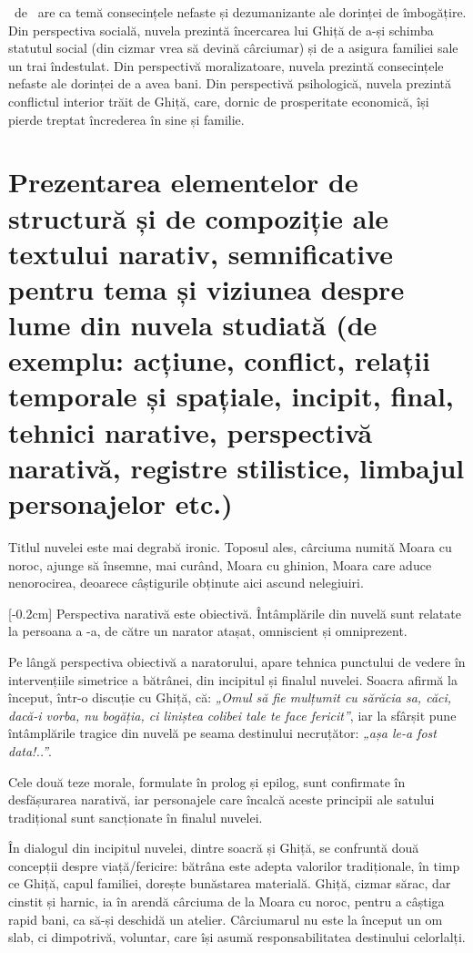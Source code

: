 \operatitle\ de \operaauthor\ are ca temă consecințele nefaste și dezumanizante ale dorinței de îmbogățire. Din perspectiva socială, nuvela prezintă încercarea lui Ghiță de a-și schimba statutul social (din cizmar vrea să devină cârciumar) și de a asigura familiei sale un trai îndestulat. Din perspectivă moralizatoare, nuvela prezintă consecințele nefaste ale dorinței de a avea bani. Din perspectivă psihologică, nuvela prezintă conflictul interior trăit de Ghiță, care, dornic de prosperitate economică, își pierde treptat încrederea în sine și familie.


\section{Prezentarea elementelor de structură și de compoziție ale textului narativ, semnificative pentru tema și viziunea despre lume din nuvela studiată {\footnotesize\normalfont (de exemplu: acțiune, conflict, relații temporale și spațiale, incipit, final, tehnici narative, perspectivă narativă, registre stilistice, limbajul personajelor etc.)}}

Titlul nuvelei este mai degrabă ironic. Toposul ales, cârciuma numită Moara cu noroc, ajunge să însemne, mai curând, Moara cu ghinion, Moara care aduce nenorocirea, deoarece câștigurile obținute aici ascund nelegiuiri.

[-0.2cm]
Perspectiva narativă este obiectivă. Întâmplările din nuvelă sunt relatate la persoana a -a, de către un narator atașat, omniscient și omniprezent.

Pe lângă perspectiva obiectivă a naratorului, apare tehnica punctului de vedere în intervențiile simetrice a bătrânei, din incipitul și finalul nuvelei. Soacra afirmă la început, într-o discuție cu Ghiță, că: \textit{„Omul să fie mulțumit cu sărăcia sa, căci, dacă-i vorba, nu bogăția, ci liniștea colibei tale te face fericit”}, iar la sfârșit pune întâmplările tragice din nuvelă pe seama destinului necruțător: \textit{„așa le-a fost data!..”}.

Cele două teze morale, formulate în prolog și epilog, sunt confirmate în desfășurarea narativă, iar personajele care încalcă aceste principii ale satului tradițional sunt sancționate în finalul nuvelei.

În dialogul din incipitul nuvelei, dintre soacră și Ghiță, se confruntă două concepții despre viață/fericire: bătrâna este adepta valorilor tradiționale, în timp ce Ghiță, capul familiei, dorește bunăstarea materială. Ghiță, cizmar sărac, dar cinstit și harnic, ia în arendă cârciuma de la Moara cu noroc, pentru a câștiga rapid bani, ca să-și deschidă un atelier. Cârciumarul nu este la început un om slab, ci dimpotrivă, voluntar, care își asumă responsabilitatea destinului celorlalți.

